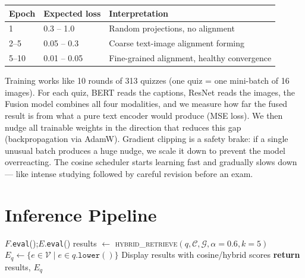 \documentclass[12pt, a4paper]{article}
\theoremstyle{definition}
\theoremstyle{plain}
\theoremstyle{remark}
\begin{document}
\begin{center}
\renewcommand{\arraystretch}{1.15}
\begin{tabular}{@{}llp{8cm}@{}}
\toprule
\textbf{Epoch} & \textbf{Expected loss} & \textbf{Interpretation} \\
\midrule
1     & 0.3 -- 1.0   & Random projections, no alignment \\
2--5  & 0.05 -- 0.3  & Coarse text-image alignment forming \\
5--10 & 0.01 -- 0.05 & Fine-grained alignment, healthy convergence \\
\bottomrule
\end{tabular}
\end{center}

\begin{tcolorbox}[layman]
Training works like 10 rounds of 313 quizzes (one quiz = one mini-batch
of 16 images).  For each quiz, BERT reads the captions, ResNet reads
the images, the Fusion model combines all four modalities, and we measure
how far the fused result is from what a pure text encoder would produce
(MSE loss).  We then nudge all trainable weights in the direction that
reduces this gap (backpropagation via AdamW).  Gradient clipping is a
safety brake: if a single unusual batch produces a huge nudge, we scale
it down to prevent the model overreacting.  The cosine scheduler starts
learning fast and gradually slows down --- like intense studying followed
by careful revision before an exam.
\end{tcolorbox}

\section{Inference Pipeline}
\label{sec:inference}

\begin{algorithm}[H]
\caption{End-to-End Inference --- Algorithm 6}
\label{alg:infer}
\begin{algorithmic}[1]
  \State $F$.\texttt{eval}();\quad $E$.\texttt{eval}()
  \State results $\gets$ \textsc{hybrid\_retrieve}$(q, \mathcal{C}, \mathcal{G}, \alpha{=}0.6, k{=}5)$
  \State $E_q \gets \{e \in \mathcal{V} \mid e \in q.\texttt{lower}()\}$
  \State Display results with cosine/hybrid scores
  \State \textbf{return} results, $E_q$
\EndProcedure
\end{algorithmic}
\end{algorithm}
\end{document}
